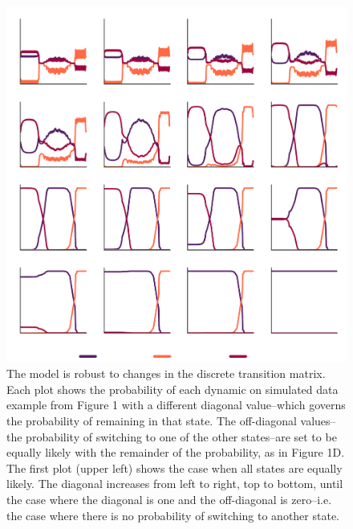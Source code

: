 \documentclass[times, twoside]{zHenriquesLab-StyleBioRxiv}
\begin{document}
\begin{figure}%
\centering
\includegraphics[width=0.80\linewidth]{figures/Figure1-supplemental1/Figure1_v1_supplemental1}
\caption{The model is robust to changes in the discrete transition matrix. Each plot shows the probability of each dynamic on simulated data example from Figure 1 with a different diagonal value--which governs the probability of remaining in that state. The off-diagonal values--the probability of switching to one of the other states--are set to be equally likely with the remainder of the probability, as in Figure 1D. The first plot (upper left) shows the case when all states are equally likely. The diagonal increases from left to right, top to bottom, until the case where the diagonal is one and the off-diagonal is zero--i.e. the case where there is no probability of switching to another state.}
\label{fig:Figure1-Figure supplement 1}
\end{figure}
\end{document}
